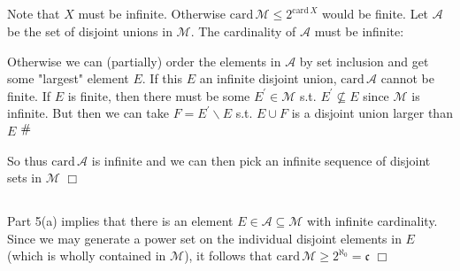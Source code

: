 \documentclass{article}
\newcommand{\contra}{\raisebox{\depth}{\#}}
\newenvironment{myindentpar}[1]
  {\begin{list}{}
          {\setlength{\leftmargin}{#1}}
          \item[]
  }
  {\end{list}}
\begin{document}
\subsection{}
Note that $X$ must be infinite. Otherwise $\textrm{card}\, \mathcal{M} \leq 2^{\mathrm{card}\,X}$ would be finite. Let $\mathcal{A}$ be the set of disjoint unions in $\mathcal{M}$. The cardinality of $\mathcal{A}$ must be infinite:
\begin{myindentpar}{2em}
    Otherwise we can (partially) order the elements in $\mathcal{A}$ by set inclusion and get some "largest" element $E$. If this $E$ an infinite disjoint union, $\textrm{card}\,\mathcal{A}$ cannot be finite. If $E$ is finite, then there must be some $E^{'} \in \mathcal{M}$ s.t. $E^{'} \nsubseteq E$ since $\mathcal{M}$ is infinite. But then we can take $F = E^{'} \backslash E$ s.t. $E \cup F$ is a disjoint union larger than $E$ $\contra$
\end{myindentpar}
So thus $\textrm{card}\,\mathcal{A}$ is infinite and we can then pick an infinite sequence of disjoint sets in $\mathcal{M}$ $\Box$
\subsection{}
Part 5(a) implies that there is an element $E \in \mathcal{A} \subseteq \mathcal{M}$ with infinite cardinality. Since we may generate a power set on the individual disjoint elements in $E$ (which is wholly contained in $\mathcal{M}$), it follows that $\textrm{card}\,\mathcal{M} \geq 2^{\aleph_0} = \mathfrak{c}$ $\Box$
\end{document}

